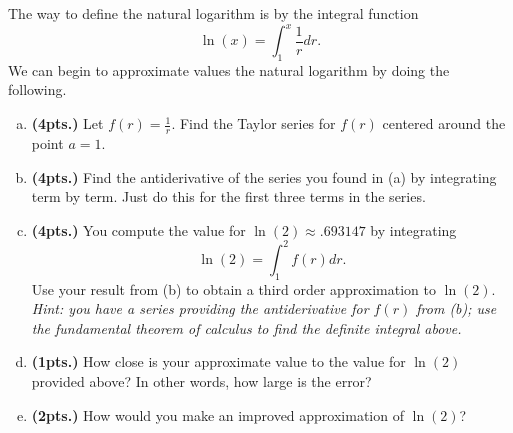 \documentclass[12pt]{amsbook}
\begin{document}
\newpage
\begin{problem}
The way to define the natural logarithm is by the integral function
\[
\ln(x)=\int_1^x \frac{1}{r}dr.
\]
We can begin to approximate values the natural logarithm by doing the following.
\begin{enumerate}[(a)]
    \item \textbf{(4pts.)} Let $f(r)=\frac{1}{r}$. Find the Taylor series for $f(r)$ centered around the point $a=1$. 
    \item \textbf{(4pts.)} Find the antiderivative of the series you found in (a) by integrating term by term. Just do this for the first three terms in the series.
    \item \textbf{(4pts.)} You compute the value for $\ln(2)\approx .693147$ by integrating
    \[
        \ln(2) = \int_1^2  f(r)dr.   
    \]
    Use your result from (b) to obtain a third order approximation to $\ln(2)$. \emph{Hint: you have a series providing the antiderivative for $f(r)$ from \textnormal{(b)}; use the fundamental theorem of calculus to find the definite integral above.}
    \item \textbf{(1pts.)} How close is your approximate value to the value for $\ln(2)$ provided above? In other words, how large is the error?
    \item \textbf{(2pts.)} How would you make an improved approximation of $\ln(2)$?
\end{enumerate}
\end{problem}
\end{document}
